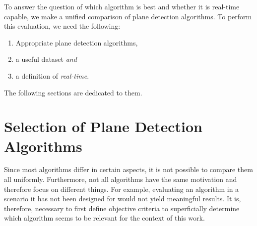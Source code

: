 \documentclass[main.tex]{subfiles}
\begin{document}
To answer the question of which algorithm is best and whether it is real-time capable, we make a unified comparison of plane detection algorithms.
To perform this evaluation, we need the following:

\begin{enumerate}
    \item \label{enum:pda}Appropriate plane detection algorithms,
    \item \label{enum:ds} a useful dataset \textit{and}
    \item \label{enum:rt} a definition of \textit{real-time}.
\end{enumerate}
The following sections are dedicated to them.



\section{Selection of Plane Detection Algorithms}\label{sec:pdaselection}

Since most algorithms differ in certain aspects, it is not possible to compare them all uniformly. Furthermore, not all algorithms have the same motivation and therefore focus on different things.
For example, evaluating an algorithm in a scenario it has not been designed for would not yield meaningful results.
It is, therefore, necessary to first define objective criteria to superficially determine which algorithm seems to be relevant for the context of this work.
\end{document}
